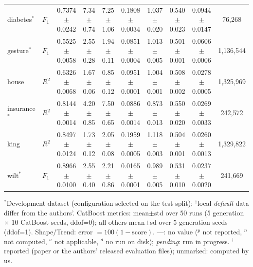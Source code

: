 \begin{table}[t]
{\begin{tabular}{llcccccccc}
diabetes$^{*}$ & $F_1$ & 0.7374{\scriptsize$\pm$0.0242} & 7.34{\scriptsize$\pm$0.74} & 7.25{\scriptsize$\pm$1.06} & 0.1808{\scriptsize$\pm$0.0034} & 1.037{\scriptsize$\pm$0.020} & 0.540{\scriptsize$\pm$0.023} & 0.0944{\scriptsize$\pm$0.0147} & 76{,}268 \\
gesture$^{*}$ & $F_1$ & 0.5525{\scriptsize$\pm$0.0058} & 2.55{\scriptsize$\pm$0.28} & 1.94{\scriptsize$\pm$0.11} & 0.0851{\scriptsize$\pm$0.0004} & 1.013{\scriptsize$\pm$0.005} & 0.501{\scriptsize$\pm$0.001} & 0.0606{\scriptsize$\pm$0.0006} & 1{,}136{,}544 \\
house & $R^2$ & 0.6326{\scriptsize$\pm$0.0068} & 1.67{\scriptsize$\pm$0.06} & 0.85{\scriptsize$\pm$0.12} & 0.0951{\scriptsize$\pm$0.0001} & 1.004{\scriptsize$\pm$0.001} & 0.508{\scriptsize$\pm$0.002} & 0.0278{\scriptsize$\pm$0.0005} & 1{,}325{,}969 \\
insurance$^{*}$ & $R^2$ & 0.8144{\scriptsize$\pm$0.0014} & 4.20{\scriptsize$\pm$0.85} & 7.50{\scriptsize$\pm$0.65} & 0.0886{\scriptsize$\pm$0.0014} & 0.873{\scriptsize$\pm$0.013} & 0.550{\scriptsize$\pm$0.020} & 0.0269{\scriptsize$\pm$0.0033} & 242{,}572 \\
king & $R^2$ & 0.8497{\scriptsize$\pm$0.0124} & 1.73{\scriptsize$\pm$0.12} & 2.05{\scriptsize$\pm$0.08} & 0.1959{\scriptsize$\pm$0.0005} & 1.118{\scriptsize$\pm$0.003} & 0.504{\scriptsize$\pm$0.001} & 0.0260{\scriptsize$\pm$0.0013} & 1{,}329{,}822 \\
wilt$^{*}$ & $F_1$ & 0.8966{\scriptsize$\pm$0.0100} & 2.55{\scriptsize$\pm$0.40} & 2.21{\scriptsize$\pm$0.86} & 0.0165{\scriptsize$\pm$0.0001} & 0.989{\scriptsize$\pm$0.005} & 0.531{\scriptsize$\pm$0.010} & 0.0237{\scriptsize$\pm$0.0020} & 241{,}669 \\
\bottomrule
\end{tabular}}
\par\smallskip\footnotesize $^{*}$Development dataset (configuration selected on the test split); $^\ddagger$local \textit{default} data differ from the authors'. CatBoost metrics: mean$\pm$std over 50 runs (5 generation $\times$ 10 CatBoost seeds, ddof=0); all others mean$\pm$sd over 5 generation seeds (ddof=1). Shape/Trend: error $=100(1-\mathrm{score})$. ---: no value ($^{p}$ not reported, $^{n}$ not computed, $^{a}$ not applicable, $^{d}$ no run on disk); \emph{pending}: run in progress. $^\dagger$reported (paper or the authors' released evaluation files); unmarked: computed by us.
\end{table}

